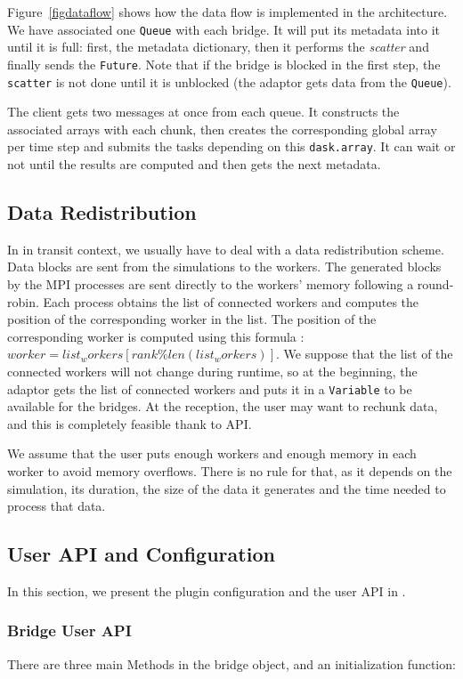 Figure~\ref{figdataflow} shows how the data flow is implemented in the \deisa architecture. We have associated one \texttt{Queue} with each bridge. It will put its metadata into it until it is full: first, the metadata dictionary, then it performs the \textit{scatter} and finally sends the \texttt{Future}. Note that if the bridge is blocked in the first step, the \texttt{scatter} is not done until it is unblocked (the adaptor gets data from the \texttt{Queue}).

The client gets two messages at once from each queue. It constructs the associated arrays with each chunk, then creates the corresponding global array per time step and submits the tasks depending on this \texttt{dask.array}. It can wait or not until the results are computed and then gets the next metadata. 


\subsection{Data Redistribution}
In in transit context, we usually have to deal with a data redistribution scheme. Data blocks are sent from the simulations to the workers. 
The generated blocks by the MPI processes are sent directly to the workers' memory following a round-robin. Each process obtains the list of connected workers and computes the position of the corresponding worker in the list. The position of the corresponding worker is computed using this formula : $worker=list_workers[rank\%len(list_workers)]$.
We suppose that the list of the connected workers will not change during runtime, so at the beginning, the adaptor gets the list of connected workers and puts it in a \dask \texttt{Variable} to be available for the bridges. 
At the reception, the user may want to rechunk data, and this is completely feasible thank to \dask API.

We assume that the user puts enough workers and enough memory in each worker to avoid memory overflows. There is no rule for that, as it depends on the simulation, its duration, the size of the data it generates and the time needed to process that data. 


\subsection{User API and Configuration}
In this section, we present the \deisa plugin configuration and the user API in \deisa. 

\subsubsection{\deisa Bridge User API}
There are three main Methods in the \deisa bridge object, and an initialization function: 

